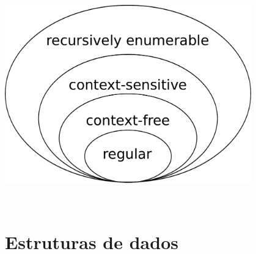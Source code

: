 \documentclass[conference]{IEEEtran}
\begin{document}



\begin{minipage}{\linewidth}
    \centering
    \label{chomsky}
    \includegraphics[width=0.8\textwidth]{Chomsky-hierarchy.pdf}
\end{minipage}
\\

\section{Estruturas de dados}

\end{document}
